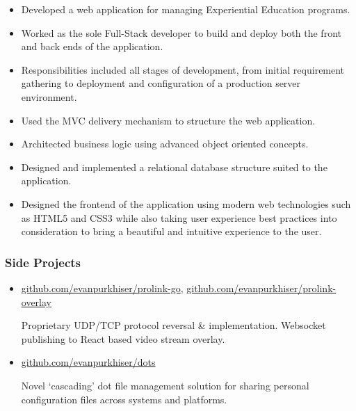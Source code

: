 \documentclass[letterpaper,10pt]{article}
\begin{document}
\begin{itemize}
\tightlist{}
\item
  Developed a web application for managing Experiential Education
  programs.
\item
  Worked as the sole Full-Stack developer to build and deploy both the front
  and back ends of the application.
\item
  Responsibilities included all stages of development, from initial
  requirement gathering to deployment and configuration of a production
  server environment.
\item
  Used the MVC delivery mechanism to structure the web application.
\item
  Architected business logic using advanced object oriented concepts.
\item
  Designed and implemented a relational database structure suited to the
  application.
\item
  Designed the frontend of the application using modern web technologies such
  as HTML5 and CSS3 while also taking user experience best practices into
  consideration to bring a beautiful and intuitive experience to the user.
\end{itemize}

\subsubsection{Side Projects}

\begin{itemize}
\item
  \href{https://github.com/evanpurkhiser/prolink-go}{github.com/evanpurkhiser/prolink-go},
  \href{https://github.com/evanpurkhiser/prolink-overlay}{github.com/evanpurkhiser/prolink-overlay}

  Proprietary UDP/TCP protocol reversal \& implementation. Websocket
  publishing to React based video stream overlay.
\item
  \href{https://github.com/evanpurkhiser/dots}{github.com/evanpurkhiser/dots}

  Novel `cascading' dot file management solution for sharing personal
  configuration files across systems and platforms.
\end{itemize}
\end{document}
